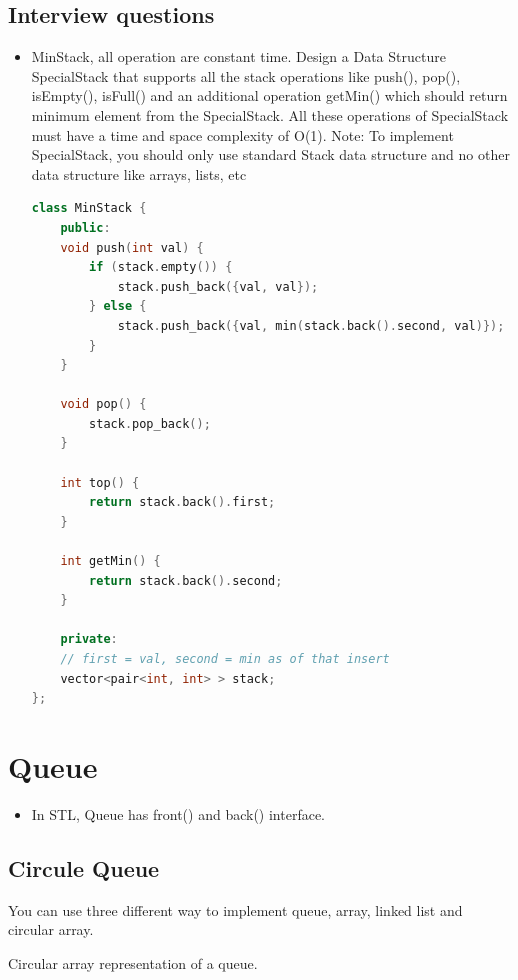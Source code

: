 \documentclass[a4paper,11pt,twoside]{book}
\begin{document}
\subsection{Interview questions}
\begin{itemize}

\item MinStack, all operation are constant time. Design a Data Structure SpecialStack that supports all the stack operations like push(), pop(), isEmpty(), isFull() and an additional operation getMin() which should return minimum element from the SpecialStack. All these operations of SpecialStack must have a time and space complexity of O(1). 
Note: To implement SpecialStack, you should only use standard Stack data structure and no other data structure like arrays, lists, etc 
\begin{lstlisting}[frame=single, language=c++, basicstyle=\scriptsize]
class MinStack {
	public:
	void push(int val) {
		if (stack.empty()) {
			stack.push_back({val, val});
		} else {
			stack.push_back({val, min(stack.back().second, val)});
		}
	}
	
	void pop() {
		stack.pop_back();
	}
	
	int top() {
		return stack.back().first;
	}
	
	int getMin() {
		return stack.back().second;
	}
	
	private:
	// first = val, second = min as of that insert
	vector<pair<int, int> > stack;
};	
\end{lstlisting}

\end{itemize}

\section{Queue}
\begin{itemize}
\item In STL, Queue has front() and back() interface. 

\end{itemize}


\subsection{Circule Queue}

	
\par You can use three different way to implement queue, array, linked list and circular array.
	
\par Circular array representation of a queue. 
\end{document}
